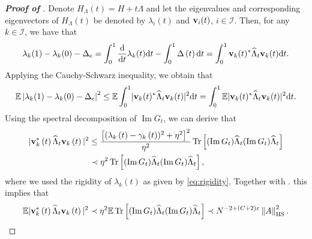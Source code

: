 \documentclass[10pt,reqno]{amsart}
\numberwithin{equation}{section}
\numberwithin{figure}{section}
\theoremstyle{plain} %
\theoremstyle{definition} %
\newcommand{\wh}{\widehat}
\renewcommand{\txt}[1]{\text{\rm{#1}}}
\newcommand{\E}{\mathbb{E}}
\newcommand{\cI}{\mathcal{I}}
\newcommand{\dd}{\mathrm{d}}
\newcommand{\pa}[1]{\left({#1}\right)}
\newcommand{\abs}[1]{\lvert #1 \rvert}
\newcommand{\norma}[1]{\left\lVert #1 \right\rVert}
\DeclareMathOperator{\tr}{\mathrm{Tr}}
\DeclareMathOperator{\im}{\mathrm{Im}}
\newcommand{\hLambda}{{\wh{\Lambda}}}
\newcommand{\HS}{\txt{HS}}
\numberwithin{equation}{section}
\begin{document}
\begin{proof}[\bf Proof of ]
    Denote $H_{\Lambda}\pa{t}=H+t\Lambda$ and let the eigenvalues and corresponding eigenvectors of $H_{\Lambda}(t)$ be denoted by $\lambda_i(t)$ and ${\bf v}_i(t)$, $i\in \cI$.
    Then, for any $k\in \cI$, we have that 
    \begin{equation} \label{ygfyz}
        \lambda_k(1)-\lambda_k(0)-\Delta_{\txt{e}}
        =\int_0^1 \frac{\dd}{\dd t}\lambda_{k}(t) \dd t-\int_0^1 \Delta\pa{t} \dd t
        =\int_0^1  {\bf v}_{k}(t)^* \hLambda_t {\bf v}_{k}(t) \dd t.
    \end{equation}
    Applying the Cauchy-Schwarz inequality, we obtain that
    \begin{equation} \label{ygfyz2}
        \mathbb E\left|\lambda_k(1)-\lambda_k(0)-\Delta_{\txt{e}}\right|^2
        \le 
         \mathbb E\int_0^1 \abs{{\bf v}_{k}(t)^* \hLambda_t {\bf v}_{k}(t) }^2 \dd t
        = \int_0^1  \mathbb E \abs{ {\bf v}_{k}(t)^* \hLambda_t {\bf v}_{k}(t) }^2  \dd t.
    \end{equation}
    Using the spectral decomposition of $\im G_t$, we can derive that
    \begin{equation}\label{bdwgy}
        \begin{aligned}
    |{\bf v}_{k}^*\pa{t} \hLambda_{t}{\bf v}_{k}\pa{t}|^2  
        &\le  \frac{\left[(\lambda_k\pa{t}-\gamma_k\pa{t})^2+\eta^2\right]^2}{\eta^2} \tr\left[  (\operatorname{Im} G_t) \hLambda_t (\operatorname{Im} G_t) \hLambda_t \right]\\ 
        &\prec \eta^2 \tr\left[  (\operatorname{Im} G_t) \hLambda_t (\operatorname{Im} G_t) \hLambda_t \right] ,
        \end{aligned}
    \end{equation}
    where we used the rigidity of $\lambda_k\pa{t}$ as given by \eqref{eq:rigidity}. Together with . this implies that
    \begin{equation}\nonumber
        \begin{aligned}
            \E|{\bf v}_{k}^*\pa{t} \hLambda_{t}{\bf v}_{k}\pa{t}|^2\prec \eta^2 \E  \tr\left[  (\operatorname{Im} G_t) \hLambda_t (\operatorname{Im} G_t) \hLambda_t \right] \prec N^{-2+\pa{C+2}\varepsilon}  \norma{A}_{\HS}^2 .
        \end{aligned}

\end{equation}
\end{proof}
\end{document}
